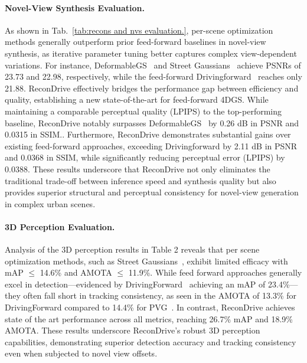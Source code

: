 \paragraph{Novel-View Synthesis Evaluation.} As shown in Tab.~\ref{tab:recons and nvs evaluation.}, per-scene optimization methods generally outperform prior feed-forward baselines in novel-view synthesis, as iterative parameter tuning better captures complex view-dependent variations. For instance, DeformableGS~\cite{yang2024deformable} and Street Gaussians~\cite{yan2024street} achieve PSNRs of 23.73 and 22.98, respectively, while the feed-forward Drivingforward~\cite{tian2025drivingforward} reaches only 21.88.
ReconDrive effectively bridges the performance gap between efficiency and quality, establishing a new state-of-the-art for feed-forward 4DGS. While maintaining a comparable perceptual quality (LPIPS) to the top-performing baseline, ReconDrive notably surpasses DeformableGS~\cite{yang2024deformable} by 0.26 dB in PSNR and 0.0315 in SSIM.. Furthermore, ReconDrive demonstrates substantial gains over existing feed-forward approaches, exceeding Drivingforward by 2.11 dB in PSNR and 0.0368 in SSIM, while significantly reducing perceptual error (LPIPS) by 0.0388. These results underscore that ReconDrive not only eliminates the traditional trade-off between inference speed and synthesis quality but also provides superior structural and perceptual consistency for novel-view generation in complex urban scenes.

\paragraph{3D Perception Evaluation.}

Analysis of the 3D perception results in Table 2 reveals that per scene optimization methods, such as Street Gaussians~\cite{yan2024street}, exhibit limited efficacy with mAP $\le$ 14.6\% and AMOTA $\le$ 11.9\%. While feed forward approaches generally excel in detection—evidenced by DrivingForward~\cite{tian2025drivingforward} achieving an mAP of 23.4\%—they often fall short in tracking consistency, as seen in the AMOTA of 13.3\% for DrivingForward compared to 14.4\% for PVG~\cite{chen2023periodic}. In contrast, ReconDrive achieves state of the art performance across all metrics, reaching 26.7\% mAP and 18.9\% AMOTA. These results underscore ReconDrive’s robust 3D perception capabilities, demonstrating superior detection accuracy and tracking consistency even when subjected to novel view offsets.

